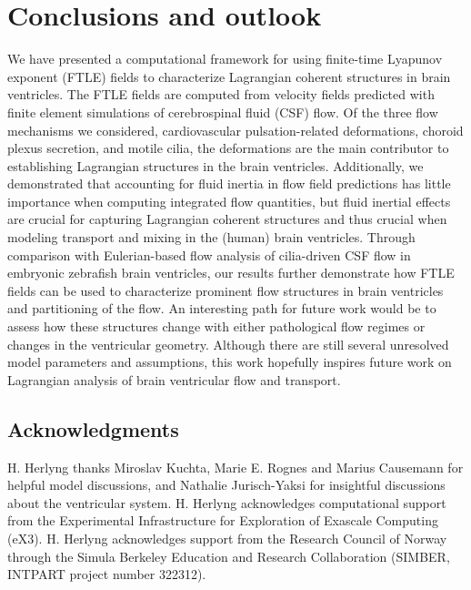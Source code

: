 \documentclass{template}
\begin{document}
\section{Conclusions and outlook}
We have presented a computational framework for using finite-time Lyapunov exponent (FTLE)
fields to characterize Lagrangian coherent structures in brain ventricles.
The FTLE fields are computed from velocity fields predicted with finite element simulations
of cerebrospinal fluid (CSF) flow. Of the three flow mechanisms we considered, cardiovascular pulsation-related
deformations, choroid plexus secretion, and motile cilia, the deformations are the main contributor to
establishing Lagrangian structures in the brain ventricles. Additionally,
we demonstrated that accounting for fluid inertia
in flow field predictions has little importance when computing integrated flow quantities,
but fluid inertial effects are crucial for capturing Lagrangian coherent structures and thus crucial when
modeling transport and mixing in the (human) brain ventricles. Through comparison with
Eulerian-based flow analysis of cilia-driven CSF flow in embryonic zebrafish brain ventricles, our results further
demonstrate how FTLE fields can be used to characterize prominent flow structures in brain ventricles
and partitioning of the flow.
An interesting path for future work would be to assess how these structures change
with either pathological flow regimes or changes in the ventricular geometry.
Although there are still several unresolved model parameters and assumptions,
this work hopefully inspires future work on Lagrangian analysis of brain ventricular flow and transport.

\subsection*{Acknowledgments}
H. Herlyng thanks Miroslav Kuchta, Marie E. Rognes
and Marius Causemann for helpful model discussions,
and Nathalie Jurisch-Yaksi for
insightful discussions about the ventricular system.
H. Herlyng acknowledges computational support from the
Experimental Infrastructure for Exploration of Exascale
Computing (eX3). H. Herlyng acknowledges support from
the Research Council of Norway through 
the Simula Berkeley Education and Research Collaboration
(SIMBER, INTPART project number 322312).

\end{document}
